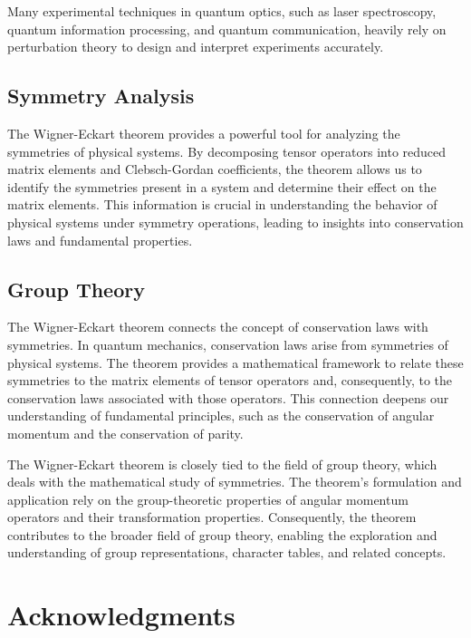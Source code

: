 \documentclass[a4paper,11pt]{article}
\begin{document}
Many experimental techniques in quantum optics, such as laser spectroscopy, quantum information processing, and quantum communication, heavily rely on perturbation theory to design and interpret experiments accurately.

\subsection{Symmetry Analysis}
The Wigner-Eckart theorem provides a powerful tool for analyzing the symmetries of physical systems. By decomposing tensor operators into reduced matrix elements and Clebsch-Gordan coefficients, the theorem allows us to identify the symmetries present in a system and determine their effect on the matrix elements. This information is crucial in understanding the behavior of physical systems under symmetry operations, leading to insights into conservation laws and fundamental properties.

\subsection{Group Theory}
The Wigner-Eckart theorem connects the concept of conservation laws with symmetries. In quantum mechanics, conservation laws arise from symmetries of physical systems. The theorem provides a mathematical framework to relate these symmetries to the matrix elements of tensor operators and, consequently, to the conservation laws associated with those operators. This connection deepens our understanding of fundamental principles, such as the conservation of angular momentum and the conservation of parity.

The Wigner-Eckart theorem is closely tied to the field of group theory, which deals with the mathematical study of symmetries. The theorem's formulation and application rely on the group-theoretic properties of angular momentum operators and their transformation properties. Consequently, the theorem contributes to the broader field of group theory, enabling the exploration and understanding of group representations, character tables, and related concepts.

\appendix
\section{Acknowledgments}








\end{document}
